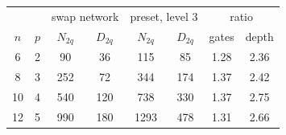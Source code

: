 \begin{tabular}{cccccccc}
& & \multicolumn{2}{c}{swap network} & \multicolumn{2}{c}{preset, level 3}
 & \multicolumn{2}{c}{ratio} \\
$n$ & $p$ & $N_{2q}$ & $D_{2q}$ & $N_{2q}$ & $D_{2q}$ & gates & depth \\
\hline
6 & 2 & 90 & 36 & 115 & 85 & 1.28 & 2.36 \\
8 & 3 & 252 & 72 & 344 & 174 & 1.37 & 2.42 \\
10 & 4 & 540 & 120 & 738 & 330 & 1.37 & 2.75 \\
12 & 5 & 990 & 180 & 1293 & 478 & 1.31 & 2.66 \\
\end{tabular}